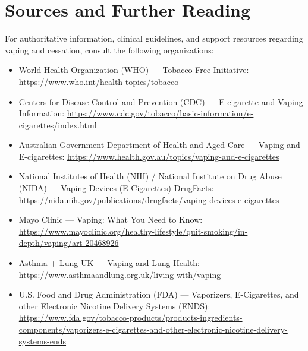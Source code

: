 \section*{Sources and Further Reading}
For authoritative information, clinical guidelines, and support resources regarding vaping and cessation, consult the following organizations:
\begin{itemize}
    \item World Health Organization (WHO) --- Tobacco Free Initiative: \url{https://www.who.int/health-topics/tobacco}
    \item Centers for Disease Control and Prevention (CDC) --- E-cigarette and Vaping Information: \url{https://www.cdc.gov/tobacco/basic-information/e-cigarettes/index.html}
    \item Australian Government Department of Health and Aged Care --- Vaping and E-cigarettes: \url{https://www.health.gov.au/topics/vaping-and-e-cigarettes}
    \item National Institutes of Health (NIH) / National Institute on Drug Abuse (NIDA) --- Vaping Devices (E-Cigarettes) DrugFacts: \url{https://nida.nih.gov/publications/drugfacts/vaping-devices-e-cigarettes}
    \item Mayo Clinic --- Vaping: What You Need to Know: \url{https://www.mayoclinic.org/healthy-lifestyle/quit-smoking/in-depth/vaping/art-20468926}
    \item Asthma + Lung UK --- Vaping and Lung Health: \url{https://www.asthmaandlung.org.uk/living-with/vaping}
    \item U.S. Food and Drug Administration (FDA) --- Vaporizers, E-Cigarettes, and other Electronic Nicotine Delivery Systems (ENDS): \url{https://www.fda.gov/tobacco-products/products-ingredients-components/vaporizers-e-cigarettes-and-other-electronic-nicotine-delivery-systems-ends}
\end{itemize}